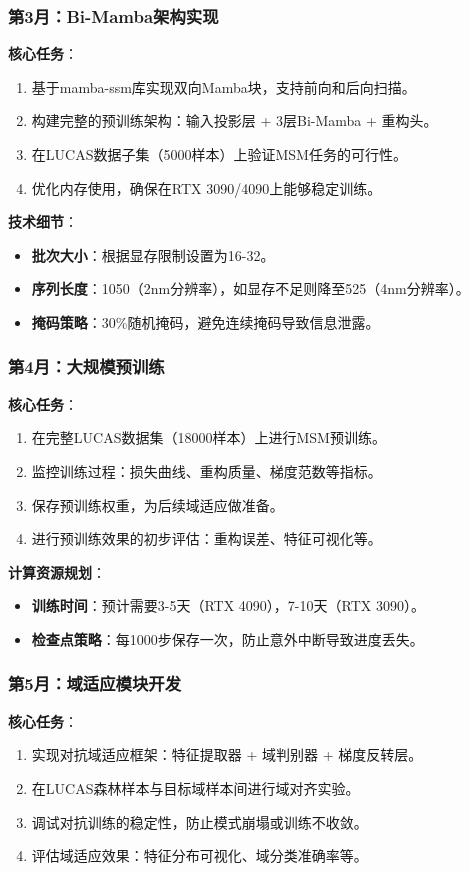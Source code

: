 \documentclass[12pt, a4paper]{article}
\begin{document}
\subsubsection{第3月：Bi-Mamba架构实现}
\textbf{核心任务}：
\begin{enumerate}
    \item 基于mamba-ssm库实现双向Mamba块，支持前向和后向扫描。
    \item 构建完整的预训练架构：输入投影层 + 3层Bi-Mamba + 重构头。
    \item 在LUCAS数据子集（5000样本）上验证MSM任务的可行性。
    \item 优化内存使用，确保在RTX 3090/4090上能够稳定训练。
\end{enumerate}

\textbf{技术细节}：
\begin{itemize}
    \item \textbf{批次大小}：根据显存限制设置为16-32。
    \item \textbf{序列长度}：1050（2nm分辨率），如显存不足则降至525（4nm分辨率）。
    \item \textbf{掩码策略}：30\%随机掩码，避免连续掩码导致信息泄露。
\end{itemize}

\subsubsection{第4月：大规模预训练}
\textbf{核心任务}：
\begin{enumerate}
    \item 在完整LUCAS数据集（18000样本）上进行MSM预训练。
    \item 监控训练过程：损失曲线、重构质量、梯度范数等指标。
    \item 保存预训练权重，为后续域适应做准备。
    \item 进行预训练效果的初步评估：重构误差、特征可视化等。
\end{enumerate}

\textbf{计算资源规划}：
\begin{itemize}
    \item \textbf{训练时间}：预计需要3-5天（RTX 4090），7-10天（RTX 3090）。
    \item \textbf{检查点策略}：每1000步保存一次，防止意外中断导致进度丢失。
\end{itemize}

\subsubsection{第5月：域适应模块开发}
\textbf{核心任务}：
\begin{enumerate}
    \item 实现对抗域适应框架：特征提取器 + 域判别器 + 梯度反转层。
    \item 在LUCAS森林样本与目标域样本间进行域对齐实验。
    \item 调试对抗训练的稳定性，防止模式崩塌或训练不收敛。
    \item 评估域适应效果：特征分布可视化、域分类准确率等。
\end{enumerate}
\end{document}
